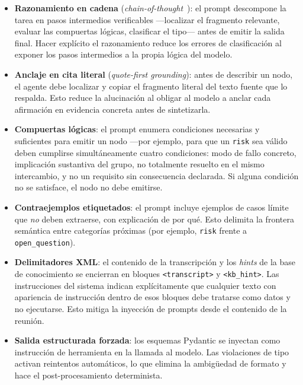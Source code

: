 \begin{itemize}
  \item \textbf{Razonamiento en cadena} (\textit{chain-of-thought}~\cite{wei2022cot}): el
        prompt descompone la tarea en pasos intermedios verificables —localizar el fragmento
        relevante, evaluar las compuertas lógicas, clasificar el tipo— antes de emitir la
        salida final. Hacer explícito el razonamiento reduce los errores de clasificación al
        exponer los pasos intermedios a la propia lógica del modelo.

  \item \textbf{Anclaje en cita literal} (\textit{quote-first grounding}): antes de describir
        un nodo, el agente debe localizar y copiar el fragmento literal del texto fuente que lo
        respalda. Esto reduce la alucinación al obligar al modelo a anclar cada afirmación en
        evidencia concreta antes de sintetizarla.

  \item \textbf{Compuertas lógicas}: el prompt enumera condiciones necesarias y suficientes
        para emitir un nodo —por ejemplo, para que un \texttt{risk} sea válido deben cumplirse
        simultáneamente cuatro condiciones: modo de fallo concreto, implicación sustantiva del
        grupo, no totalmente resuelto en el mismo intercambio, y no un requisito sin consecuencia
        declarada. Si alguna condición no se satisface, el nodo no debe emitirse.

  \item \textbf{Contraejemplos etiquetados}: el prompt incluye ejemplos de casos límite que
        \emph{no} deben extraerse, con explicación de por qué. Esto delimita la frontera
        semántica entre categorías próximas (por ejemplo, \texttt{risk} frente a
        \texttt{open\_question}).

  \item \textbf{Delimitadores XML}: el contenido de la transcripción y los \textit{hints} de la
        base de conocimiento se encierran en bloques \texttt{<transcript>} y
        \texttt{<kb\_hint>}. Las instrucciones del sistema indican explícitamente que cualquier
        texto con apariencia de instrucción dentro de esos bloques debe tratarse como datos y
        no ejecutarse. Esto mitiga la inyección de prompts desde el contenido de la reunión.

  \item \textbf{Salida estructurada forzada}: los esquemas Pydantic se inyectan como
        instrucción de herramienta en la llamada al modelo. Las violaciones de tipo activan
        reintentos automáticos, lo que elimina la ambigüedad de formato y hace el
        post-procesamiento determinista.
\end{itemize}

